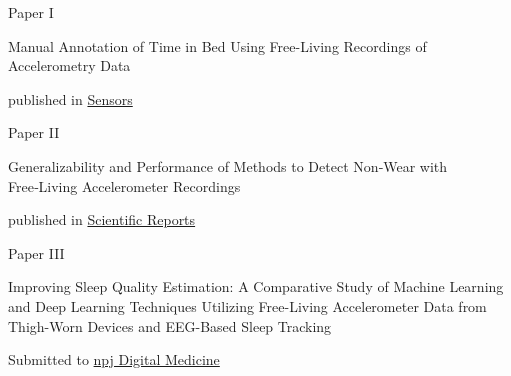 \begin{center}

Paper I

\textsf{Manual Annotation of Time in Bed Using Free-Living Recordings of Accelerometry Data}

published in \href{https://doi.org/10.3390/s21248442}{Sensors}

\vspace{2cm}
Paper II

\textsf{Generalizability and Performance of Methods to Detect Non‑Wear with Free‑Living Accelerometer Recordings}

published in \href{https://doi.org/10.1038/s41598-023-29666-x}{Scientific Reports}

\vspace{2cm}
Paper III 

\textsf{Improving Sleep Quality Estimation: A Comparative Study of Machine Learning and Deep Learning Techniques Utilizing Free-Living Accelerometer Data from Thigh-Worn Devices and EEG-Based Sleep Tracking}

Submitted to \href{https://www.nature.com/npjdigitalmed/}{npj Digital Medicine}

\end{center}

\newpage